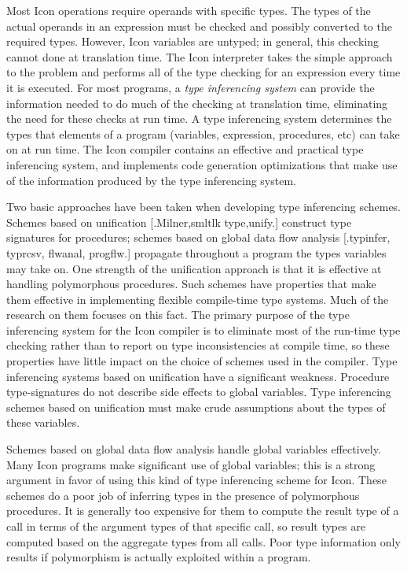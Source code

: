Most Icon operations require operands with specific types. The types
of the actual operands in an expression must be checked and possibly
converted to the required types. However, Icon variables are untyped;
in general, this checking cannot done at translation time. The Icon
interpreter takes the simple approach to the problem and performs all
of the type checking for an expression every time it is executed. For
most programs, a \textit{type inferencing system} can provide the
information needed to do much of the checking at translation time,
eliminating the need for these checks at run time. A type inferencing
system determines the types that elements of a program (variables,
expression, procedures, etc) can take on at run time. The Icon
compiler contains an effective and practical type inferencing system,
and implements code generation optimizations that make use of the
information produced by the type inferencing system.

Two basic approaches have been taken when developing type inferencing
schemes. Schemes based on unification [.Milner,smltlk type,unify.]
construct type signatures for procedures; schemes based on global data
flow analysis [.typinfer, typrcsv, flwanal, progflw.] propagate
throughout a program the types variables may take on. One strength of
the unification approach is that it is effective at handling
polymorphous procedures. Such schemes have properties that make them
effective in implementing flexible compile-time type systems. Much of
the research on them focuses on this fact. The primary purpose of the
type inferencing system for the Icon compiler is to eliminate most of
the run-time type checking rather than to report on type
inconsistencies at compile time, so these properties have little
impact on the choice of schemes used in the compiler. Type inferencing
systems based on unification have a significant weakness.  Procedure
type-signatures do not describe side effects to global variables. Type
inferencing schemes based on unification must make crude assumptions
about the types of these variables.

Schemes based on global data flow analysis handle global variables
effectively. Many Icon programs make significant use of global
variables; this is a strong argument in favor of using this kind of
type inferencing scheme for Icon. These schemes do a poor job of
inferring types in the presence of polymorphous procedures. It is
generally too expensive for them to compute the result type of a call
in terms of the argument types of that specific call, so result types
are computed based on the aggregate types from all calls. Poor type
information only results if polymorphism is actually exploited within
a program.

